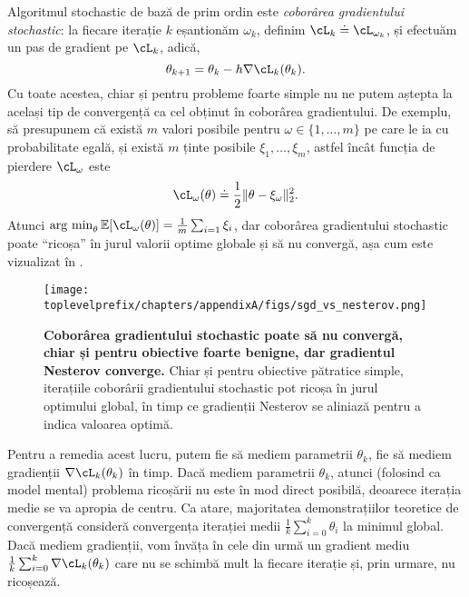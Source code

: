 \documentclass[../../book-main_ro.tex]{subfiles}
\begin{document}
Algoritmul stochastic de bază de prim ordin este \textit{coborârea gradientului stochastic}: la fiecare iterație \(k\) eșantionăm \(\omega_{k}\), definim \(\cL_{k} \doteq \cL_{\omega_{k}}\), și efectuăm un pas de gradient pe \(\cL_{k}\), adică,
\begin{equation}
    \theta_{k + 1} = \theta_{k} - h\nabla \cL_{k}(\theta_{k}).
\end{equation}
Cu toate acestea, chiar și pentru probleme foarte simple nu ne putem aștepta la același tip de convergență ca cel obținut în coborârea gradientului. De exemplu, să presupunem că există \(m\) valori posibile pentru \(\omega \in \{1, \dots, m\}\) pe care le ia cu probabilitate egală, și există \(m\) ținte posibile \(\xi_{1}, \dots, \xi_{m}\), astfel încât funcția de pierdere \(\cL_{\omega}\) este
\begin{equation}
    \cL_{\omega}(\theta) \doteq \frac{1}{2}\norm{\theta - \xi_{\omega}}_{2}^{2}.
\end{equation}
Atunci \(\argmin_{\theta}\Ex[\cL_{\omega}(\theta)] = \frac{1}{m}\sum_{i = 1}\xi_{i}\), dar coborârea gradientului stochastic poate ``ricoșa'' în jurul valorii optime globale și să nu convergă, așa cum este vizualizat în .

\begin{figure}
    \texttt{[image: \\toplevelprefix/chapters/appendixA/figs/sgd\_vs\_nesterov.png]}
    \centering 
    \caption{\small\textbf{Coborârea gradientului stochastic poate să nu convergă, chiar și pentru obiective foarte benigne, dar gradientul Nesterov converge.} Chiar și pentru obiective pătratice simple, iterațiile coborârii gradientului stochastic pot ricoșa în jurul optimului global, în timp ce gradienții Nesterov se aliniază pentru a indica valoarea optimă.}
    \label{fig:sgd_nonconvergence}
\end{figure}

Pentru a remedia acest lucru, putem fie să mediem parametrii \(\theta_{k}\), fie să mediem gradienții \(\nabla \cL_{k}(\theta_{k})\) în timp. Dacă mediem parametrii \(\theta_{k}\), atunci (folosind  ca model mental) problema ricoșării nu este în mod direct posibilă, deoarece iterația medie se va apropia de centru. Ca atare, majoritatea demonstrațiilor teoretice de convergență consideră convergența iterației medii \(\frac{1}{k}\sum_{i = 0}^{k}\theta_{i}\) la minimul global. Dacă mediem gradienții, vom învăța în cele din urmă un gradient mediu \(\frac{1}{k}\sum_{i = 0}^{k}\nabla \cL_{k}(\theta_{k})\) care nu se schimbă mult la fiecare iterație și, prin urmare, nu ricoșează.
\end{document}
